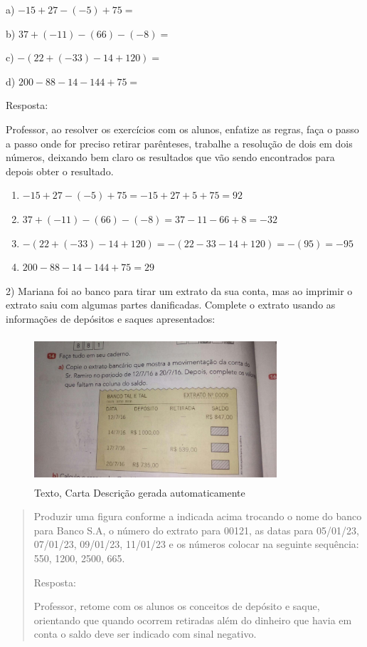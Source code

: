 a) \(- 15 + 27 - \left( - 5 \right) + 75 =\)

b) \(37 + \left( - 11 \right) - \left( 66 \right) - ( - 8) =\)

c) \(- (22 + \left( - 33 \right) - 14 + 120) =\)

d) \(200 - 88 - 14 - 144 + 75 =\)

Resposta:

Professor, ao resolver os exercícios com os alunos, enfatize as regras,
faça o passo a passo onde for preciso retirar parênteses, trabalhe a
resolução de dois em dois números, deixando bem claro os resultados que
vão sendo encontrados para depois obter o resultado.

\begin{enumerate}
\def\labelenumi{\alph{enumi})}
\item
  \(- 15 + 27 - \left( - 5 \right) + 75 = - 15 + 27 + 5 + 75 = 92\)
\item
  \(37 + \left( - 11 \right) - \left( 66 \right) - \left( - 8 \right) = 37 - 11 - 66 + 8 = - 32\)
\item
  \(- \left( 22 + \left( - 33 \right) - 14 + 120 \right) = - \left( 22 - 33 - 14 + 120 \right) = - \left( 95 \right) = - 95\)
\item
  \(200 - 88 - 14 - 144 + 75 = 29\)
\end{enumerate}

2) Mariana foi ao banco para tirar um extrato da sua conta, mas ao
imprimir o extrato saiu com algumas partes danificadas. Complete o
extrato usando as informações de depósitos e saques apresentados:

\begin{figure}
\centering
\includegraphics[width=3.54698in,height=2.14059in]{./imgSAEB_7_MAT/media/image2.jpg}
\caption{Texto, Carta Descrição gerada automaticamente}
\end{figure}

\begin{quote}
Produzir uma figura conforme a indicada acima trocando o nome do banco
para Banco S.A, o número do extrato para 00121, as datas para 05/01/23,
07/01/23, 09/01/23, 11/01/23 e os números colocar na seguinte sequência:
550, 1200, 2500, 665.

Resposta:

Professor, retome com os alunos os conceitos de depósito e saque,
orientando que quando ocorrem retiradas além do dinheiro que havia em
conta o saldo deve ser indicado com sinal negativo.
\end{quote}

